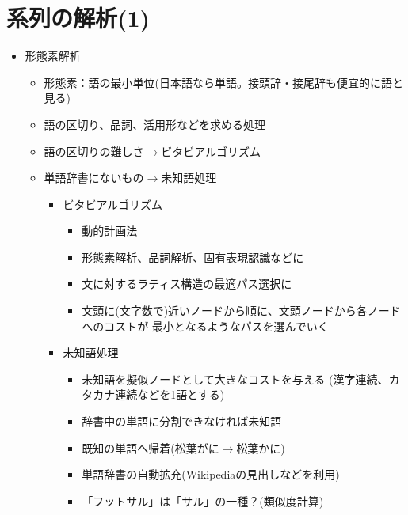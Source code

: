 \documentclass[a4j,11pt]{jsarticle}
\begin{document}
\section{系列の解析(1)}
\begin{itemize}
 \item 形態素解析
       \begin{itemize}
	\item 形態素：語の最小単位(日本語なら単語。接頭辞・接尾辞も便宜的に語と見る)
	\item 語の区切り、品詞、活用形などを求める処理
	\item 語の区切りの難しさ$\rightarrow$ビタビアルゴリズム
	\item 単語辞書にないもの$\rightarrow$未知語処理
	      \begin{itemize}

	       \item ビタビアルゴリズム
		     \begin{itemize}
		      \item 動的計画法
		      \item 形態素解析、品詞解析、固有表現認識などに
		      \item 文に対するラティス構造の最適パス選択に
		      \item 文頭に(文字数で)近いノードから順に、文頭ノードから各ノードへのコストが
			    最小となるようなパスを選んでいく
		     \end{itemize}
	       \item 未知語処理
		     \begin{itemize}
		      \item 未知語を擬似ノードとして大きなコストを与える
			    (漢字連続、カタカナ連続などを1語とする)
		      \item 辞書中の単語に分割できなければ未知語
		      \item 既知の単語へ帰着(松葉がに$\rightarrow$松葉かに)
		      \item 単語辞書の自動拡充(Wikipediaの見出しなどを利用)
		      \item 「フットサル」は「サル」の一種？(類似度計算)
		     \end{itemize}
	      \end{itemize}
       \end{itemize}
\end{itemize}
\end{document}
